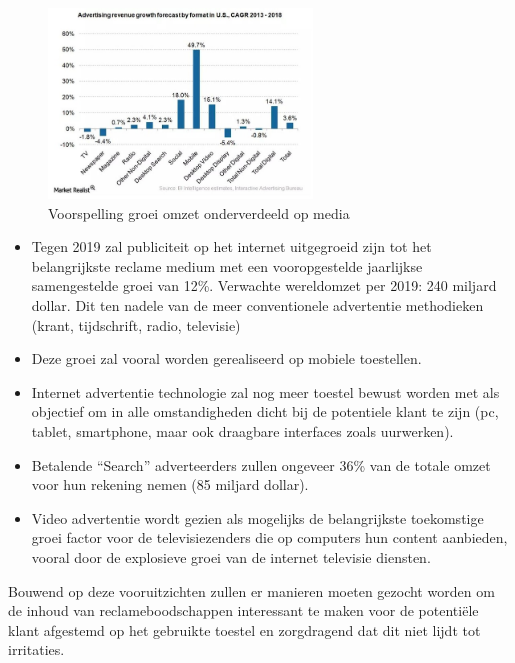 \documentclass[pdftex,a4paper,12pt,twoside]{report}
\begin{document}
\begin{figure}[h!]
\centering
\includegraphics[width=7cm]{img/advRevGrowthFormat}
\caption{Voorspelling groei omzet onderverdeeld op media}
\label{fig: Advertising revenue growth forecast by format}
\end{figure} 

\begin{itemize}
	\item 	Tegen 2019 zal publiciteit op het internet uitgegroeid zijn tot het belangrijkste reclame medium met een vooropgestelde jaarlijkse samengestelde groei van 	12\%. Verwachte wereldomzet per 2019: 240 miljard dollar. Dit ten nadele van de meer conventionele advertentie methodieken (krant, tijdschrift, radio, televisie)
	
	\item	Deze groei zal vooral worden gerealiseerd op mobiele toestellen.
	\item	Internet advertentie technologie zal nog meer toestel bewust worden met als objectief om in alle omstandigheden dicht bij de potentiele klant te zijn (pc, tablet, smartphone, maar ook draagbare interfaces zoals uurwerken).
	\item	Betalende “Search” adverteerders zullen ongeveer 36\% van de totale omzet voor hun rekening nemen (85 miljard dollar).
	\item	Video advertentie wordt gezien als mogelijks de belangrijkste toekomstige groei factor voor de televisiezenders die op computers hun content aanbieden, vooral door de explosieve groei van de internet televisie diensten.
\end{itemize}
Bouwend op deze vooruitzichten zullen er manieren moeten gezocht worden om de inhoud van reclameboodschappen interessant te maken voor de potentiële klant afgestemd op het gebruikte toestel en zorgdragend dat dit niet lijdt tot irritaties. 
\end{document}
